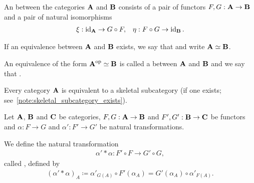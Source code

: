\begin{definition}\label{def:category_equivalence}\cite[definition 1.3.15]{Leinster2014}
  An  between the categories \( \operatorname{\mathbf{A}} \) and \( \operatorname{\mathbf{B}} \) consists of a pair of functors \( F, G: \operatorname{\mathbf{A}} \to \operatorname{\mathbf{B}} \) and a pair of natural isomorphisms
  \begin{align*}
    \xi: \operatorname{id}_{\operatorname{\mathbf{A}}} \to G \circ F,
    &&
    \eta: F \circ G \to \operatorname{id}_{\operatorname{\mathbf{B}}}.
  \end{align*}

  If an equivalence between \( \operatorname{\mathbf{A}} \) and \( \operatorname{\mathbf{B}} \) exists, we say that  and write \( \operatorname{\mathbf{A}} \simeq \operatorname{\mathbf{B}} \).

  An equivalence of the form \( \operatorname{\mathbf{A}}^{\operatorname{op}} \simeq \operatorname{\mathbf{B}} \) is called a  between \( \operatorname{\mathbf{A}} \) and \( \operatorname{\mathbf{B}} \) and we say that  \cite[example 1.3.22]{Leinster2014}.
\end{definition}

\begin{proposition}\label{thm:skeletal_subcategory_equivalence}\cite[91]{MacLane1994}
  Every category \( \operatorname{\mathbf{A}} \) is equivalent to a skeletal subcategory (if one exists; see~\cref{note:skeletal_subcategory_exists}).
\end{proposition}

\begin{definition}\label{def:natural_transformation_horizontal_composition}\cite[remarks 1.3.24]{Leinster2014}
  Let \( \operatorname{\mathbf{A}} \), \( \operatorname{\mathbf{B}} \) and \( \operatorname{\mathbf{C}} \) be categories, \( F, G: \operatorname{\mathbf{A}} \to \operatorname{\mathbf{B}} \) and \( F', G': \operatorname{\mathbf{B}} \to \operatorname{\mathbf{C}} \) be functors and \( \alpha: F \to G \) and \( \alpha': F' \to G' \) be natural transformations.
  \begin{Center}
  \end{Center}

  We define the natural transformation
  \begin{align*}
    \alpha' * \alpha: F' \circ F \to G' \circ G,
  \end{align*}
  called , defined by
  \begin{align*}
    (\alpha' * \alpha)_A \coloneqq \alpha'_{G(A)} \circ F'(\alpha_A) = G'(\alpha_A) \circ \alpha'_{F(A)}.
  \end{align*}
\end{definition}

